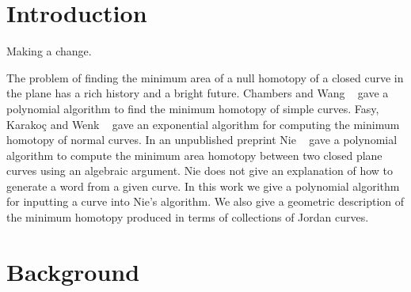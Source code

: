 \documentclass[11pt]{article}
\begin{document}
\maketitle



\section{Introduction}
Making a change.

The problem of finding the minimum area of a null homotopy of a closed curve in the plane has a rich history and a bright future. Chambers and Wang ~\cite{cw2013} gave a polynomial algorithm to find the minimum homotopy of simple curves. Fasy, Karako\c{c} and Wenk ~\cite{fkw2017} gave an exponential algorithm for computing the minimum homotopy of normal curves. In an unpublished preprint Nie ~\cite{nie2014} gave a polynomial algorithm to compute the minimum area homotopy between two closed plane curves using an algebraic argument. Nie does not give an explanation of how to generate a word from a given curve. In this work we give a polynomial algorithm for inputting a curve into Nie's algorithm. We also give a geometric description of the minimum homotopy produced in terms of collections of Jordan curves. 





\section{Background}
\end{document}
